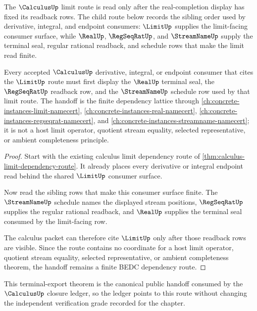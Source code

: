 The $\CalculusUp$ limit route is read only after the real-completion display has fixed its readback rows. The child route below records the sibling order used by derivative, integral, and endpoint consumers: $\LimitUp$ supplies the limit-facing consumer surface, while $\RealUp$, $\RegSeqRatUp$, and $\StreamNameUp$ supply the terminal seal, regular rational readback, and schedule rows that make the limit read finite.

\begin{theorem}
\label{thm:calculus-limit-dependency-route-real-handoff}
Every accepted $\CalculusUp$ derivative, integral, or endpoint consumer that cites the $\LimitUp$ route must first display the $\RealUp$ terminal seal, the $\RegSeqRatUp$ readback row, and the $\StreamNameUp$ schedule row used by that limit route. The handoff is the finite dependency lattice through \autoref{ch:concrete-instances-limit-namecert}, \autoref{ch:concrete-instances-real-namecert}, \autoref{ch:concrete-instances-regseqrat-namecert}, and \autoref{ch:concrete-instances-streamname-namecert}; it is not a host limit operator, quotient stream equality, selected representative, or ambient completeness principle.
\end{theorem}
\begin{proof}
Start with the existing calculus limit dependency route of \autoref{thm:calculus-limit-dependency-route}. It already places every derivative or integral endpoint read behind the shared $\LimitUp$ consumer surface.

Now read the sibling rows that make this consumer surface finite. The $\StreamNameUp$ schedule names the displayed stream positions, $\RegSeqRatUp$ supplies the regular rational readback, and $\RealUp$ supplies the terminal seal consumed by the limit-facing row.

The calculus packet can therefore cite $\LimitUp$ only after those readback rows are visible. Since the route contains no coordinate for a host limit operator, quotient stream equality, selected representative, or ambient completeness theorem, the handoff remains a finite BEDC dependency route.
\end{proof}

This terminal-export theorem is the canonical public handoff consumed by the $\CalculusUp$ closure ledger, so the ledger points to this route without changing the independent verification grade recorded for the chapter.

